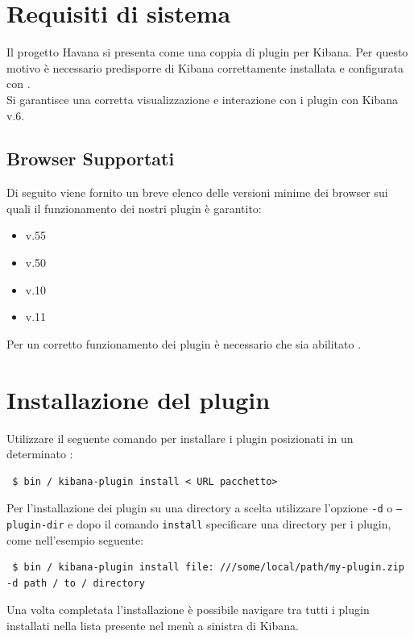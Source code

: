 \newpage
\section{Requisiti di sistema}
Il progetto Havana si presenta come una coppia di plugin per Kibana. Per questo motivo è necessario predisporre di Kibana correttamente installata e configurata con .
\\ Si garantisce una corretta visualizzazione e interazione con i plugin con Kibana v.6.
\subsection{Browser Supportati}

Di seguito viene fornito un breve elenco delle versioni minime dei browser sui quali il funzionamento dei nostri plugin è garantito:
\begin{itemize}
	
	\item {} v.55
	\item {} v.50
	\item {} v.10
	\item {} v.11
	
\end{itemize}

Per un corretto funzionamento dei plugin è necessario che sia abilitato .

\section{Installazione del plugin}
Utilizzare il seguente comando per installare i plugin posizionati in un determinato :
\begin{lstlisting}
 $ bin / kibana-plugin install < URL pacchetto>
\end{lstlisting}

Per l'installazione dei plugin su una directory a scelta utilizzare l'opzione \texttt{-d} o \texttt{--plugin-dir} e dopo il comando \texttt{install} specificare una directory per i plugin, come nell'esempio seguente:
\begin{lstlisting}
 $ bin / kibana-plugin install file: ///some/local/path/my-plugin.zip -d path / to / directory 
\end{lstlisting}

Una volta completata l'installazione è possibile navigare tra tutti i plugin installati nella lista presente nel menù a sinistra di Kibana.

